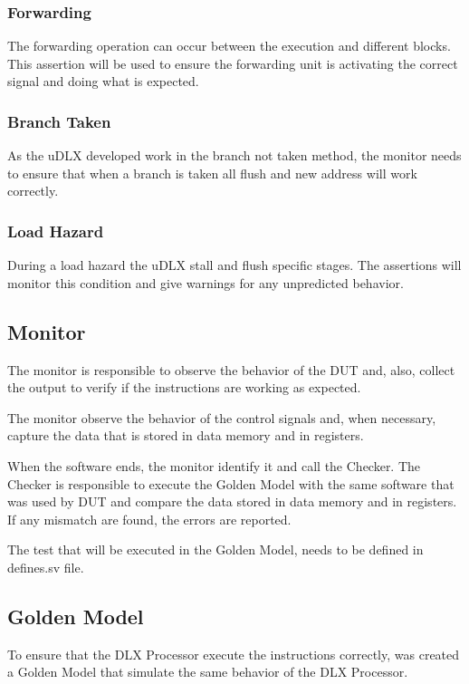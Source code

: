 \documentclass{article}
\begin{document}
	\subsubsection{Forwarding}
	
	The forwarding operation can occur between the execution and different blocks. This assertion will be used to ensure the forwarding unit is activating the correct signal and doing what is expected.
	
	\subsubsection{Branch Taken}
	
	As the uDLX developed work in the branch not taken method, the monitor needs to ensure that when a branch is taken all flush and new address will work correctly.
	
	\subsubsection{Load Hazard}

	During a load hazard the uDLX stall and flush specific stages. The assertions will monitor this condition and give warnings for any unpredicted behavior.	
	
	\subsection{Monitor}
	
	The monitor is responsible to observe the behavior of the DUT and, also, collect the output to verify if the instructions are working as expected.
	
	The monitor observe the behavior of the control signals and, when necessary, capture the data that is stored in data memory and in registers.
	
	When the software ends, the monitor identify it and call the Checker.
The Checker is responsible to execute the Golden Model with the same software that was used by DUT and compare the data stored in data memory and in registers. If any mismatch are found, the errors are reported.

	The test that will be executed in the Golden Model, needs to be defined in defines.sv file.

	\subsection{Golden Model}
	To ensure that the DLX Processor execute the instructions correctly, was created a Golden Model that simulate the same behavior of the DLX Processor.
	
\end{document}
